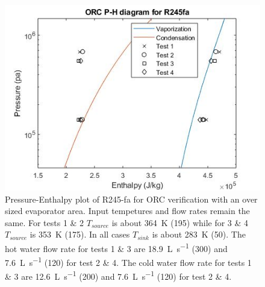 \begin{figure}%
	\centering

	\includegraphics[width=\textwidth]{figures/VerificationPH02}
	\caption{Pressure-Enthalpy plot of R245-fa for ORC verification with an over sized evaporator area. Input tempetures and flow rates remain the same. 
	For tests 1 \& 2 $T_{source}$ is about \SI{364}{\kelvin} (\SI{195}{\degreeFahrenheit})
	while for 3 \& 4 $T_{source}$ is \SI{353}{\kelvin} (\SI{175}{\degreeFahrenheit}). 
	In all cases $T_{sink}$ is about \SI{283}{\kelvin} (\SI{50}{\degreeFahrenheit}). 
	The hot water flow rate for tests 1 \& 3 are \SI{18.9}{\liter\per\second} (\SI{300}{\gpm})
	and	\SI{7.6}{\liter\per\second} (\SI{120}{\gpm}) for test 2 \& 4. 
	The cold water flow rate for tests 1 \& 3 are \SI{12.6}{\liter\per\second} (\SI{200}{\gpm})
	and \SI{7.6}{\liter\per\second} (\SI{120}{\gpm}) for test 2 \& 4.}
	\label{fig:verifcation_ph02}
\end{figure}